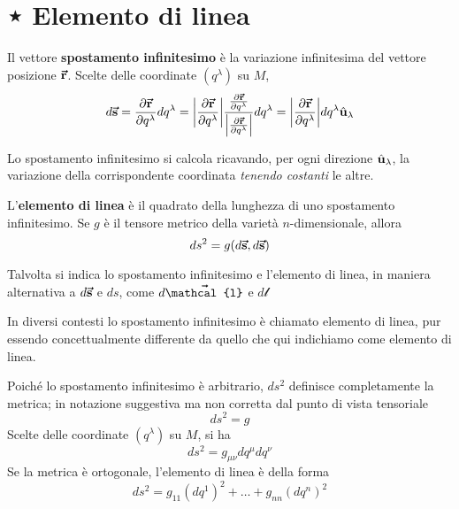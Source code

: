 \section{⋆ Elemento di linea}
\begin{define}
	Il vettore \textbf{spostamento infinitesimo} è la variazione infinitesima del vettore posizione $\vb*{\va{r}}$. Scelte delle coordinate $(q^\lambda)$ su $M$, %
	\begin{equation}
		d\vb*{\va{s}}=\pdv{\vb*{\va{r}}}{q^\lambda}dq^\lambda=\abs{\pdv{\vb*{\va{r}}}{q^\lambda}}\frac{\pdv{\vb*{\va{r}}}{q^\lambda}}{\abs{\pdv{\vb*{\va{r}}}{q^\lambda}}}dq^\lambda=\abs{\pdv{\vb*{\va{r}}}{q^\lambda}}dq^\lambda\hat{\mathbf{u}}_\lambda
	\end{equation}
\end{define}
Lo spostamento infinitesimo si calcola ricavando, per ogni direzione $\hat{\mathbf{u}}_\lambda$, la variazione della corrispondente coordinata \textit{tenendo costanti} le altre.
\begin{define}
	L'\textbf{elemento di linea} è il quadrato della lunghezza di uno spostamento infinitesimo. Se $g$ è il tensore metrico della varietà $n$-dimensionale, allora
	\begin{equation}
		ds^2=g(d\vb*{\va{s}},d\vb*{\va{s}})
	\end{equation}
\end{define}
\begin{notate}
	Talvolta si indica lo spostamento infinitesimo e l'elemento di linea, in maniera alternativa a $d\vb*{\va{s}}$ e $ds$, come $d\vba{\mathcal{l}}$ e $d\mathcal{l}$
\end{notate}
\begin{attention}
	In diversi contesti lo spostamento infinitesimo è chiamato elemento di linea, pur essendo concettualmente differente da quello che qui indichiamo come elemento di linea.
\end{attention}
Poiché lo spostamento infinitesimo è arbitrario, $ds^2$ definisce completamente la metrica; in notazione suggestiva ma non corretta dal punto di vista tensoriale
\begin{equation}
	ds^2=g
\end{equation}
Scelte delle coordinate $(q^\lambda)$ su $M$, si ha
\begin{equation}
	ds^2=g_{\mu\nu}dq^{\mu}dq^{\nu}
\end{equation}
Se la metrica è ortogonale, l'elemento di linea è della forma
\begin{equation}
	ds^2=g_{11}\left(dq^1\right)^2+\ldots+g_{nn}\left(dq^n\right)^2
\end{equation}
